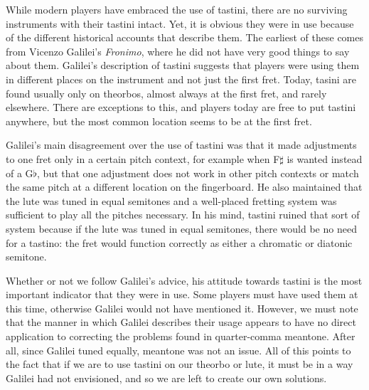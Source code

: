 While modern players have embraced the use of tastini, there are no surviving
instruments with their tastini intact.  Yet, it is obvious they were in use
because of the different historical accounts that describe them.  The earliest
of these comes from Vicenzo Galilei's \textit{Fronimo}, where he did not have
very good things to say about them. Galilei's description of tastini suggests
that players were using them in different places on the instrument and not just
the first fret.\autocite[165]{VG:1} Today, tasini are found usually only
on theorbos, almost always at the first fret, and rarely elsewhere. There are
exceptions to this, and players today are free to put tastini anywhere, but the
most common location seems to be at the first fret.

Galilei's main disagreement over the use of tastini was that it made adjustments to one
fret only in a certain pitch context, for example when F$\sharp$ is wanted instead
of a G$\flat$, but that one adjustment does not work in other pitch contexts or match the
same pitch at a different location on the fingerboard.  He also
maintained that the lute was tuned in equal semitones and a well-placed fretting system
was sufficient to play all the pitches necessary. In his mind, tastini ruined that sort of system
because if the lute was tuned in equal semitones, there would be no need for
a tastino: the fret would function correctly as either a chromatic or diatonic
semitone.

Whether or not we follow Galilei's advice, his attitude towards tastini is the most
important indicator that they were in use.  Some players must have used them at this
time, otherwise Galilei would not have mentioned it.  However, we must note that the
manner in which Galilei describes their usage appears to have no direct application to
correcting the problems found in quarter-comma meantone.  After all, since Galilei
tuned equally, meantone was not an issue.  All of this points to the fact
that if we are to use tastini on our theorbo or lute, it must be in a way Galilei had
not envisioned, and so we are left to create our own solutions.

